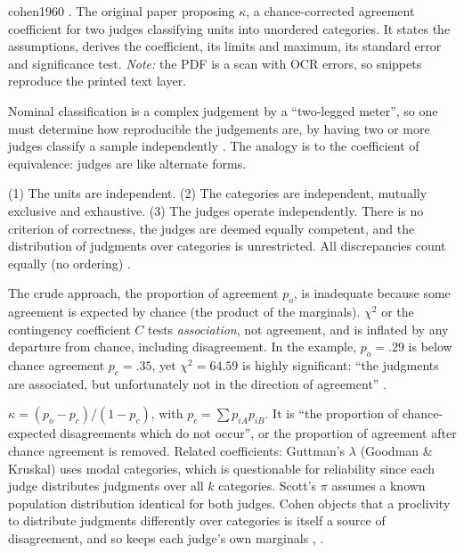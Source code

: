 \begin{papercard}{cohen1960}
 . The original paper proposing $\kappa$, a chance-corrected agreement coefficient for two judges classifying units into unordered categories. It states the assumptions, derives the coefficient, its limits and maximum, its standard error and significance test. \emph{Note:} the PDF is a scan with OCR errors, so snippets reproduce the printed text layer.

 Nominal classification is a complex judgement by a ``two-legged meter'', so one must determine how reproducible the judgements are, by having two or more judges classify a sample independently . The analogy is to the coefficient of equivalence: judges are like alternate forms.

 (1) The units are independent. (2) The categories are independent, mutually exclusive and exhaustive. (3) The judges operate independently. There is no criterion of correctness, the judges are deemed equally competent, and the distribution of judgments over categories is unrestricted. All discrepancies count equally (no ordering) .

 The crude approach, the proportion of agreement $p_o$, is inadequate because some agreement is expected by chance (the product of the marginals). $\chi^2$ or the contingency coefficient $C$ tests \emph{association}, not agreement, and is inflated by any departure from chance, including disagreement. In the example, $p_o=.29$ is below chance agreement $p_c=.35$, yet $\chi^2=64.59$ is highly significant: ``the judgments are associated, but unfortunately not in the direction of agreement'' .

 $\kappa=(p_o-p_c)/(1-p_c)$, with $p_c=\sum p_{iA}p_{iB}$. It is ``the proportion of chance-expected disagreements which do not occur'', or the proportion of agreement after chance agreement is removed. Related coefficients: Guttman's $\lambda$ (Goodman \& Kruskal) uses modal categories, which is questionable for reliability since each judge distributes judgments over all $k$ categories. Scott's $\pi$ assumes a known population distribution identical for both judges. Cohen objects that a proclivity to distribute judgments differently over categories is itself a source of disagreement, and so keeps each judge's own marginals , .


\end{papercard}

